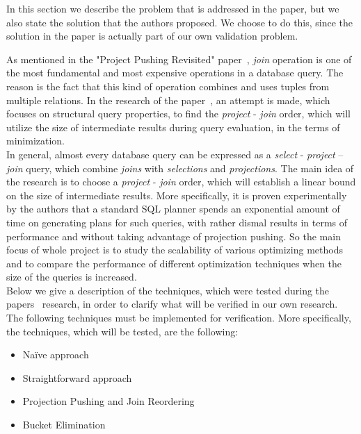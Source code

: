 In this section we describe the problem that is addressed in the paper, but we also state the solution that the authors proposed. We choose to do this, since the solution in the paper is actually part of our own validation problem.

As mentioned in the "Project Pushing Revisited" paper~\cite{paper}, \textit{join} operation is one of the most fundamental and most expensive operations in a database query. The reason is the fact that this kind of operation combines and uses tuples from multiple relations. In the research of the paper~\cite{paper}, an attempt is made, which focuses on structural query properties, to find the \textit{project} - \textit{join} order, which will utilize the size of intermediate results during query evaluation, in the terms of minimization. \\

In general, almost every database query can be expressed as a \textit{select} - \textit{project} – \textit{join} query, which combine \textit{joins} with \textit{selections} and \textit{projections}. The main idea of the research is to choose a \textit{project} - \textit{join} order, which will establish a linear bound on the size of intermediate results. More specifically, it is proven experimentally by the authors that a standard SQL planner spends an exponential amount of time on generating plans for such queries, with rather dismal results in terms of performance and without taking advantage of projection pushing. So the main focus of whole project is to study the scalability of various optimizing methods and to compare the performance of different optimization techniques when the size of the queries is increased. \\

Below we give a description of the techniques, which were tested during the papers~\cite{paper} research, in order to clarify what will be verified in our own research. The following techniques must be implemented for verification. More specifically, the techniques, which will be tested, are the following:

\begin{itemize}
	\item Na\"ive approach
	\item Straightforward approach
	\item Projection Pushing and Join Reordering
	\item Bucket Elimination
\end{itemize}

